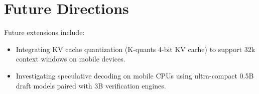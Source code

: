 \documentclass[12pt,a4paper,oneside]{report}
\begin{document}
\section{Future Directions}
Future extensions include:
\begin{itemize}
    \item Integrating KV cache quantization (K-quants 4-bit KV cache) to support 32k context windows on mobile devices.
    \item Investigating speculative decoding on mobile CPUs using ultra-compact 0.5B draft models paired with 3B verification engines.
\end{itemize}

\end{document}
